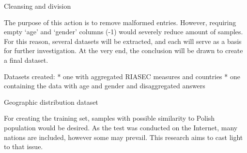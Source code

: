 \documentclass[11pt]{article}
\begin{document}
{Cleansing and division}\label{cleansing-and-division}

The purpose of this action is to remove malformed entries. However,
requiring empty `age' and `gender' columns (-1) would severely reduce
amount of samples. For this reason, several datasets will be extracted,
and each will serve as a basis for further investigation. At the very
end, the conclusion will be drawn to create a final dataset.

Datasets created: * one with aggregated RIASEC measures and countries *
one containing the data with age and gender and disaggregated answers

{Geographic distribution
dataset}\label{geographic-distribution-dataset}

For creating the training set, samples with possible similarity to
Polish population would be desired. As the test was conducted on the
Internet, many nations are included, however some may prevail. This
research aims to cast light to that issue.
\end{document}
